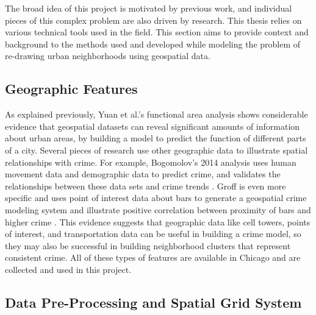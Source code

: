 \documentclass[times new roman,12pt]{article}
\begin{document}
The broad idea of this project is motivated by previous work, and individual pieces of this complex problem are also driven by research. This thesis relies on various technical tools used in the field. This section aims to provide context and background to the methods used and developed while modeling the problem of re-drawing urban neighborhoods using geospatial data.

\subsection{Geographic Features}

As explained previously, Yuan et al.'s functional area analysis \cite{yuan_discovering_2012} shows considerable evidence that geospatial datasets can reveal significant amounts of information about urban areas, by building a model to predict the function of different parts of a city. Several pieces of research use other geographic data to illustrate spatial relationships with crime. For example, Bogomolov's 2014 analysis uses human movement data and demographic data to predict crime, and validates the relationships between these data sets and crime trends \cite{bogomolov_once_2014}. Groff is even more specific and uses point of interest data about bars to generate a geospatial crime modeling system and illustrate positive correlation between proximity of bars and higher crime \cite{groff_measuring_2013}. This evidence suggests that geographic data like cell towers, points of interest, and transportation data can be useful in building a crime model, so they may also be successful in building neighborhood clusters that represent consistent crime. All of these types of features are available in Chicago and are collected and used in this project.

\subsection{Data Pre-Processing and Spatial Grid System}
\end{document}
